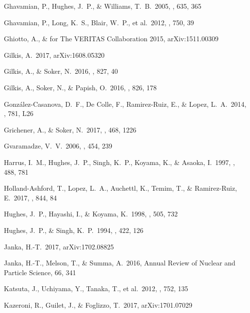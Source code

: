 \documentclass[12pt,preprint,a4paper]{aastex}
\begin{document}
\begin{thebibliography}
 Ghavamian, P., Hughes, J.~P., \& Williams, T.~B.\ 2005, \apj, 635, 365 

 Ghavamian, P., Long, K.~S., Blair, W.~P., et al.\ 2012, \apj, 750, 39 

  Ghiotto, A., \& for The VERITAS Collaboration 2015, arXiv:1511.00309 

 Gilkis, A.\ 2017, arXiv:1608.05320

  Gilkis, A., \& Soker, N.\ 2016, \apj, 827, 40

 Gilkis, A., Soker, N., \& Papish, O.\ 2016, \apj, 826, 178

 Gonz{\'a}lez-Casanova, D.~F., De Colle, F., Ramirez-Ruiz, E., \& Lopez, L.~A.\ 2014, \apjl, 781, L26

 Grichener, A., \& Soker, N.\ 2017, \mnras, 468, 1226 

  Gvaramadze, V.~V.\ 2006, \aap, 454, 239

 Harrus, I.~M., Hughes, J.~P., Singh, K.~P., Koyama, K., \& Asaoka, I.\ 1997, \apj, 488, 781

 Holland-Ashford, T., Lopez, L.~A., Auchettl, K., Temim, T., \& Ramirez-Ruiz, E.\ 2017, \apj, 844, 84 

 Hughes, J.~P., Hayashi, I., \& Koyama, K.\ 1998, \apj, 505, 732

 Hughes, J.~P., \& Singh, K.~P.\ 1994, \apj, 422, 126

 Janka, H.-T.\ 2017, arXiv:1702.08825 

 Janka, H.-T., Melson, T., \& Summa, A.\ 2016, Annual Review of Nuclear and Particle Science, 66, 341

 Katsuta, J., Uchiyama, Y., Tanaka, T., et al.\ 2012, \apj, 752, 135


 Kazeroni, R., Guilet, J., \& Foglizzo, T.\ 2017, arXiv:1701.07029


\end{thebibliography}
\end{document}
